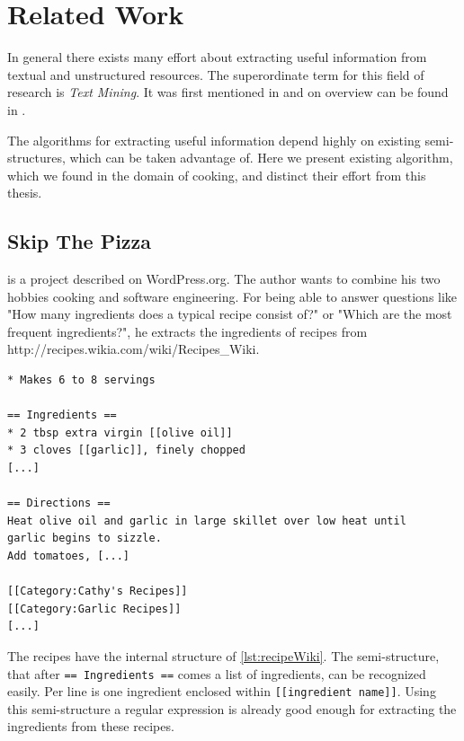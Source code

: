 \documentclass[12pt, twoside]{report}
\begin{document}
\chapter{Related Work}
In general there exists many effort about extracting useful information from textual and unstructured resources. The superordinate term for this field of research is \textit{Text Mining}. It was first mentioned in \parencite{KDT} and on overview can be found in \parencite{surveyOfTextMining}. 

The algorithms for extracting useful information depend highly on existing semi-structures, which can be taken advantage of. Here we present existing algorithm, which we found in the domain of cooking, and distinct their effort from this thesis.

\section{Skip The Pizza}
\parencite{REgutGenug} is a project described on WordPress.org. The author wants to combine his two hobbies cooking and software engineering. For being able to answer questions like "How many ingredients does a typical recipe consist of?" or "Which are the most frequent ingredients?", he extracts the ingredients of recipes from http://recipes.wikia.com/wiki/Recipes\_Wiki.

\begin{lstlisting}[frame=single, basicstyle=\footnotesize\ttfamily,caption={Shortened example recipe from \\ http://recipes.wikia.com/wiki/Recipes\_Wiki}, label=lst:recipeWiki]
    * Makes 6 to 8 servings

== Ingredients ==
* 2 tbsp extra virgin [[olive oil]]
* 3 cloves [[garlic]], finely chopped
[...]

== Directions ==
Heat olive oil and garlic in large skillet over low heat until
garlic begins to sizzle.
Add tomatoes, [...]

[[Category:Cathy's Recipes]]
[[Category:Garlic Recipes]]
[...]
\end{lstlisting}

The recipes have the internal structure of \cref{lst:recipeWiki}. The semi-structure, that after \texttt{== Ingredients ==} comes a list of ingredients, can be recognized easily. Per line is one ingredient enclosed within \texttt{[[ingredient name]]}. Using this semi-structure a regular expression is already good enough for extracting the ingredients from these recipes.
\end{document}
